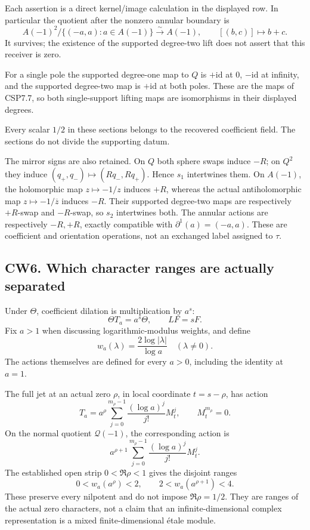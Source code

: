 Each assertion is a direct kernel/image calculation in the displayed
row. In particular the quotient after the nonzero annular boundary is \[
A(-1)^2/\{(-a,a):a\in A(-1)\}
\xrightarrow{\sim}A(-1),\qquad[(b,c)]\mapsto b+c.
\tag{CW5.6}
\] It survives; the existence of the supported degree-two lift does not
assert that this receiver is zero.

For a single pole the supported degree-one map to \(Q\) is
\(+\mathrm{id}\) at \(0\), \(-\mathrm{id}\) at infinity, and the
supported degree-two map is \(+\mathrm{id}\) at both poles. These are
the maps of CSP7.7, so both single-support lifting maps are isomorphisms
in their displayed degrees.

Every scalar \(1/2\) in these sections belongs to the recovered
coefficient field. The sections do not divide the supporting datum.

The mirror signs are also retained. On \(Q\) both sphere swaps induce
\(-R\); on \(Q^2\) they induce \((q_+,q_-)\mapsto(Rq_-,Rq_+)\). Hence
\(s_1\) intertwines them. On \(A(-1)\), the holomorphic map
\(z\mapsto-1/z\) induces \(+R\), whereas the actual antiholomorphic map
\(z\mapsto-1/\overline z\) induces \(-R\). Their supported degree-two
maps are respectively \(+R\)-swap and \(-R\)-swap, so \(s_2\)
intertwines both. The annular actions are respectively \(-R,+R\),
exactly compatible with \(\partial^1(a)=(-a,a)\). These are coefficient
and orientation operations, not an exchanged label assigned to \(\tau\).

\subsection{CW6. Which character ranges are actually
separated}\label{cw6.-which-character-ranges-are-actually-separated}

Under \(\Theta\), coefficient dilation is multiplication by \(a^s\): \[
\Theta T_a=a^s\Theta,\qquad L F=sF.
\tag{CW6.1}
\] Fix \(a>1\) when discussing logarithmic-modulus weights, and define
\[
w_a(\lambda)=\frac{2\log|\lambda|}{\log a}\quad(\lambda\ne0).
\tag{CW6.2}
\] The actions themselves are defined for every \(a>0\), including the
identity at \(a=1\).

The full jet at an actual zero \(\rho\), in local coordinate
\(t=s-\rho\), has action \[
T_a=a^\rho\sum_{j=0}^{m_\rho-1}
\frac{(\log a)^j}{j!}M_t^j,\qquad M_t^{m_\rho}=0.
\tag{CW6.3}
\] On the normal quotient \(\mathcal Q(-1)\), the corresponding action
is \[
a^{\rho+1}\sum_{j=0}^{m_\rho-1}
\frac{(\log a)^j}{j!}M_t^j.
\tag{CW6.4}
\] The established open strip \(0<\Re\rho<1\) gives the disjoint ranges
\[
0<w_a(a^\rho)<2,\qquad
2<w_a(a^{\rho+1})<4.
\tag{CW6.5}
\] These preserve every nilpotent and do not impose \(\Re\rho=1/2\).
They are ranges of the actual zero characters, not a claim that an
infinite-dimensional complex representation is a mixed
finite-dimensional étale module.

